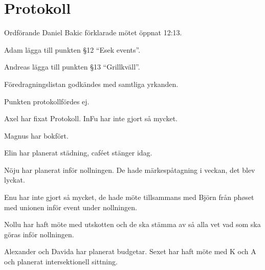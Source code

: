 \documentclass[10pt]{article}
\def\mo{Daniel Bakic}
\begin{document}
\section*{Protokoll}
\begin{paragrafer}
	Ordförande {\mo} förklarade mötet öppnat 12:13.
		
	{\valavmo}
		
	{\valavms}
		
	{\valavj}
		
	{\tosg}
		
	{\ingaadj}
		
	Adam \ypa lägga till punkten \S12 ``Esek events''.
	
	Andreas \ypa lägga till punkten \S13 ``Grillkväll''.
	
	Föredragningslistan godkändes med samtliga yrkanden.
		
	\ingaprot
		
	\begin{fyllnadsval} %
	\end{fyllnadsval}
		
	\begin{paragrafer}
		Punkten protokollfördes ej.
				
		Axel har fixat Protokoll. InFu har inte gjort så mycket.

		Magnus har bokfört.

		Elin har planerat städning, caféet stänger idag.

		Nöju har planerat inför nollningen. De hade märkespåtagning i veckan, det blev lyckat.

		Enu har inte gjort så mycket, de hade möte tillsammans med Björn från phøset med unionen inför event under nollningen.

		Nollu har haft möte med utskotten och de ska stämma av så alla vet vad som ska göras inför nollningen. 

		Alexander och Davida har planerat budgetar. Sexet har haft möte med K och A och planerat intersektionell sittning.


\end{paragrafer}
\end{paragrafer}
\end{document}
